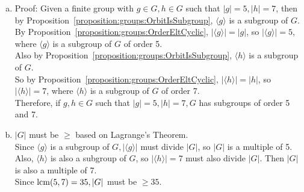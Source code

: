 \begin{enumerate}[(a)]
\item
Proof: Given a finite group with $g \in G, h \in G$ such that $|g| = 5, |h| = 7$, then by Proposition~\ref{proposition:groups:OrbitIsSubgroup}, $\langle g \rangle$ is a subgroup of $G$.
\\
By Proposition~\ref{proposition:groups:OrderEltCyclic}, $|\langle g \rangle| = |g|$, so $|\langle g \rangle| = 5$, where $\langle g \rangle$ is a subgroup of $G$ of order 5.
\\
Also by Proposition~\ref{proposition:groups:OrbitIsSubgroup}, $\langle h \rangle$ is a subgroup of $G$.
\\
So by Proposition~\ref{proposition:groups:OrderEltCyclic}, $|\langle h \rangle| = |h|$, so $|\langle h \rangle| = 7$, where $\langle h \rangle$ is a subgroup of $G$ of order 7.
\\
Therefore, if $g, h \in G$ such that $|g| = 5, |h| = 7, G$ has subgroups of order 5 and 7.

\item
$|G|$ must be $\geq$ based on Lagrange's Theorem.
\\
Since $\langle g \rangle$ is a subgroup of $G, |\langle g \rangle|$ must divide $|G|$, so $|G|$ is a multiple of 5.
\\
Also, $\langle h \rangle$ is also a subgroup of $G$, so $|\langle h \rangle| =7$ must also divide $|G|$.  Then $|G|$ is also a multiple of 7.
\\
Since $\operatorname{lcm}(5, 7) = 35, |G|$ must be $\geq 35$. 
\end{enumerate}

